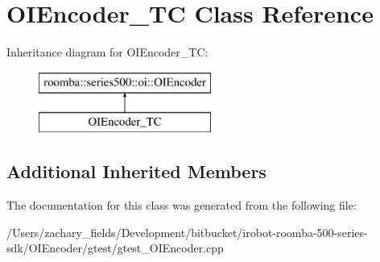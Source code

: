 \hypertarget{class_o_i_encoder___t_c}{\section{O\+I\+Encoder\+\_\+\+T\+C Class Reference}
\label{class_o_i_encoder___t_c}
}
Inheritance diagram for O\+I\+Encoder\+\_\+\+T\+C\+:\begin{figure}[H]
\begin{center}
\leavevmode
\includegraphics[height=2.000000cm]{class_o_i_encoder___t_c}
\end{center}
\end{figure}
\subsection*{Additional Inherited Members}


The documentation for this class was generated from the following file\+:\begin{DoxyCompactItemize}
\item 
/\+Users/zachary\+\_\+fields/\+Development/bitbucket/irobot-\/roomba-\/500-\/series-\/sdk/\+O\+I\+Encoder/gtest/gtest\+\_\+\+O\+I\+Encoder.\+cpp\end{DoxyCompactItemize}
